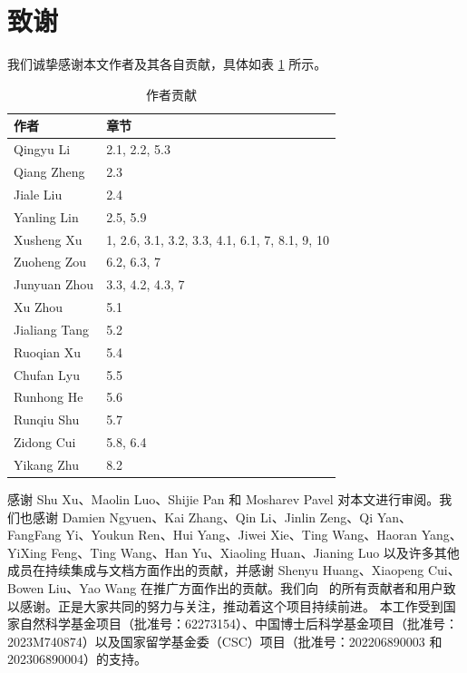 \documentclass[pra,twocolumn,superscriptaddress,floatfix,nofootinbib,amsmath,amssymb]{revtex4-1}
\numberwithin{equation}{section}
\numberwithin{figure}{section}
\numberwithin{table}{section}
\begin{document}
\section{致谢}
\label{sec:acknowledgement}
我们诚挚感谢本文作者及其各自贡献，具体如表 \ref{tab:contributions} 所示。

\begin{table}[ht]
    \begin{tabular}{|p{3cm}|p{3cm}|}
        \toprule
        作者          & 章节                                           \\
        \midrule
        Qingyu Li     & 2.1, 2.2, 5.3                                  \\
        Qiang Zheng   & 2.3                                            \\
        Jiale Liu     & 2.4                                            \\
        Yanling Lin   & 2.5, 5.9                                       \\
        Xusheng Xu    & 1, 2.6, 3.1, 3.2, 3.3, 4.1, 6.1, 7, 8.1, 9, 10 \\
        Zuoheng Zou   & 6.2, 6.3, 7                                    \\
        Junyuan Zhou  & 3.3, 4.2, 4.3, 7                               \\
        Xu Zhou       & 5.1                                            \\
        Jialiang Tang & 5.2                                            \\
        Ruoqian Xu    & 5.4                                            \\
        Chufan Lyu    & 5.5                                            \\
        Runhong He    & 5.6                                            \\
        Runqiu Shu    & 5.7                                            \\
        Zidong Cui    & 5.8, 6.4                                       \\
        Yikang Zhu    & 8.2                                            \\
        \bottomrule
    \end{tabular}
    \caption{作者贡献}
    \label{tab:contributions}
\end{table}

感谢 Shu Xu、Maolin Luo、Shijie Pan 和 Mosharev Pavel 对本文进行审阅。我们也感谢 Damien Ngyuen、Kai Zhang、Qin Li、Jinlin Zeng、Qi Yan、FangFang Yi、Youkun Ren、Hui Yang、Jiwei Xie、Ting Wang、Haoran Yang、YiXing Feng、Ting Wang、Han Yu、Xiaoling Huan、Jianing Luo 以及许多其他成员在持续集成与文档方面作出的贡献，并感谢 Shenyu Huang、Xiaopeng Cui、Bowen Liu、Yao Wang 在推广方面作出的贡献。我们向 \MindQuantum\ 的所有贡献者和用户致以感谢。正是大家共同的努力与关注，推动着这个项目持续前进。
本工作受到国家自然科学基金项目（批准号：62273154）、中国博士后科学基金项目（批准号：2023M740874）以及国家留学基金委（CSC）项目（批准号：202206890003 和 202306890004）的支持。

\end{document}
